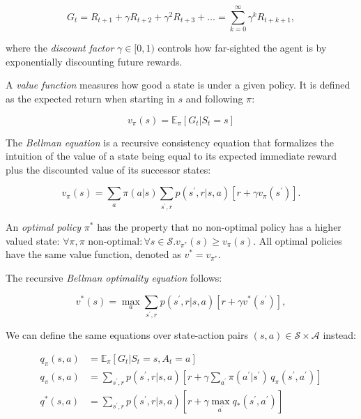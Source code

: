 \begin{equation}\label{eq:return}
  G_t=R_{t+1}+\gamma R_{t+2}+\gamma^2 R_{t+3}+\dots=\sum_{k=0}^{\infty}\gamma^k R_{t+k+1},
\end{equation}

where the \emph{discount factor} $\gamma\in[0,1)$ controls how far-sighted the agent is
by exponentially discounting future rewards.

A \emph{value function} measures how good a state is under a given policy.
It is defined as the expected return when starting in $s$ and following $\pi$:

\begin{equation}\label{eq:value-function}
  v_\pi(s)=\mathbb{E}_\pi[G_t|S_t=s]
\end{equation}

The \emph{Bellman equation} is a recursive consistency equation that formalizes the
intuition of the value of a state being equal to its expected immediate reward plus
the discounted value of its successor states:

\begin{equation}\label{eq:bellman-v}
  v_\pi(s)=\sum_a\pi(a|s)\sum_{s^\prime,r}p(s^\prime,r|s,a)\left[r+\gamma v_\pi(s^\prime)\right].
\end{equation}

An \emph{optimal policy} $\pi^*$ has the property that no non-optimal policy has
a higher valued state: $\forall \pi,\pi\text{ non-optimal}:\forall s\in\mathcal{S}.v_{\pi^*}(s)\geq v_\pi(s)$.
All optimal policies have the same value function, denoted as $v^*=v_{\pi^*}$.

The recursive \emph{Bellman optimality equation} follows:

\begin{equation}\label{eq:bellman-opt}
  v^*(s)=\max_a\sum_{s^\prime,r}p(s^\prime,r|s,a)\left[r+\gamma v^*(s^\prime)\right],
\end{equation}

We can define the same equations over state-action pairs $(s,a)\in\mathcal{S}\times\mathcal{A}$ instead:

\begin{align}
  q_\pi(s,a)&=\mathbb{E}_\pi[G_t|S_t=s,A_t=a]\label{eq:q-function}\\
  q_\pi(s,a)&=\sum_{s^\prime,r}p(s^\prime,r|s,a)\left[r+\gamma\sum_{a^\prime}\pi(a^\prime|s^\prime)\,q_\pi(s^\prime,a^\prime)\right]\label{eq:bellman-q}\\
  q^*(s,a)&=\sum_{s^\prime,r}p(s^\prime,r|s,a)\left[r+\gamma\max_{a^\prime}q_*(s^\prime,a^\prime)\right]\label{eq:bellman-opt-q}
\end{align}

